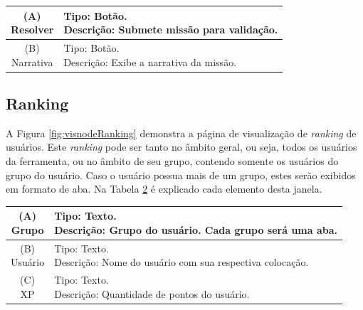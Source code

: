 \documentclass[
	12pt,				%
	oneside,			%
	a4paper,			%
	english,			%
	french,				%
	spanish,			%
	brazil,				%
	]{abntex2}
\begin{document}
\begin{table}[H]
\centering
{} \label{tab:visnodeDesktop}
\renewcommand{\arraystretch}{1.8}
\setlength{\tabcolsep}{10pt}
\begin{tabular}{|c|l|}
  \hline
  \makecell{(A) \\ Resolver} 
  &
  \makecell[l]{Tipo: Botão.\\ Descrição: Submete missão para validação.} \\
  \hline
  \makecell{(B) \\ Narrativa} 
  &
  \makecell[l]{Tipo: Botão.\\ Descrição: Exibe a narrativa da missão.} \\
  \hline
\end{tabular}
\centering
\sourceAuthor
\end{table}

\subsection{Ranking}

A Figura \ref{fig:visnodeRanking} demonstra a página de visualização de \textit{ranking} de usuários. Este \textit{ranking} pode ser tanto no âmbito geral, ou seja, todos os usuários da ferramenta, ou no âmbito de seu grupo, contendo somente os usuários do grupo do usuário. Caso o usuário possua mais de um grupo, estes serão exibidos em formato de aba. Na Tabela \ref{tab:ranking} é explicado cada elemento desta janela.

\begin{table}[H]
\centering
{} \label{tab:ranking}
\renewcommand{\arraystretch}{1.8}
\setlength{\tabcolsep}{10pt}
\begin{tabular}{|c|l|}
  \hline
  \makecell{(A) \\ Grupo} 
  &
  \makecell[l]{Tipo: Texto.\\ Descrição: Grupo do usuário. Cada grupo será uma aba.} \\
  \hline
  \makecell{(B) \\ Usuário} 
  &
  \makecell[l]{Tipo: Texto.\\ Descrição: Nome do usuário com sua respectiva colocação.} \\
  \hline
  \makecell{(C) \\ XP} 
  &
  \makecell[l]{Tipo: Texto.\\ Descrição: Quantidade de pontos do usuário.} \\
  \hline 
\end{tabular}
\centering
\sourceAuthor
\end{table}
\end{document}
